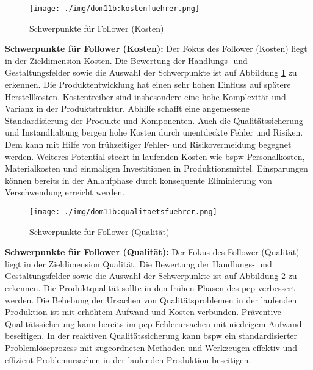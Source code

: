 \begin{figure}[ht]
 \centering
 \texttt{[image: ./img/dom11b:kostenfuehrer.png]}
 \caption{Schwerpunkte für Follower (Kosten) \cite{Dombrowski2011b}}
 \label{fig:dom11b:kostenfuehrer}
\end{figure}

\textbf{Schwerpunkte für Follower (Kosten):} Der Fokus des Follower (Kosten) liegt in der Zieldimension Kosten. 
Die Bewertung der Handlungs- und Gestaltungsfelder sowie die Auswahl der Schwerpunkte ist auf Abbildung \ref{fig:dom11b:kostenfuehrer} zu erkennen. 
%
Die Produktentwicklung hat einen sehr hohen Einfluss auf spätere Herstellkosten. %
Kostentreiber sind insbesondere eine hohe Komplexität und Varianz in der Produktstruktur. Abhilfe schafft eine angemessene Standardisierung der Produkte und Komponenten. 
Auch die Qualitätssicherung und Instandhaltung bergen hohe Kosten durch unentdeckte Fehler und Risiken. Dem kann mit Hilfe von frühzeitiger Fehler- und Risikovermeidung begegnet werden. 
Weiteres Potential steckt in laufenden Kosten wie \gls{bspw} Personalkosten, Materialkosten und einmaligen Investitionen in Produktionsmittel. Einsparungen können bereits in der Anlaufphase durch konsequente Eliminierung von Verschwendung erreicht werden. 

\begin{figure}[ht]
 \centering
 \texttt{[image: ./img/dom11b:qualitaetsfuehrer.png]}
 \caption{Schwerpunkte für Follower (Qualität) \cite{Dombrowski2011b}}
 \label{fig:dom11b:qualitaetsfuehrer}
\end{figure}

\textbf{Schwerpunkte für Follower (Qualität):} Der Fokus des Follower (Qualität) liegt in der Zieldimension Qualität.
Die Bewertung der Handlungs- und Gestaltungsfelder sowie die Auswahl der Schwerpunkte ist auf Abbildung \ref{fig:dom11b:qualitaetsfuehrer} zu erkennen. 
%
Die Produktqualität sollte in den frühen Phasen des \gls{pep} verbessert werden. Die Behebung der Ursachen von Qualitätsproblemen in der laufenden Produktion ist mit erhöhtem Aufwand und Kosten verbunden. Präventive Qualitätssicherung kann bereits im \gls{pep} Fehlerursachen mit niedrigem Aufwand beseitigen. 
In der reaktiven Qualitätssicherung kann \gls{bspw} ein standardisierter Problemlöseprozess mit zugeordneten Methoden und Werkzeugen effektiv und effizient Problemursachen in der laufenden Produktion beseitigen. 

